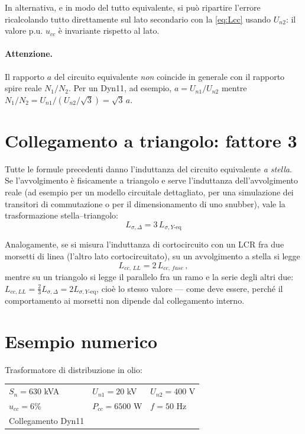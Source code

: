 \documentclass[11pt,a4paper]{article}
\begin{document}
In alternativa, e in modo del tutto equivalente, si può ripartire l'errore ricalcolando
tutto direttamente sul lato secondario con la \eqref{eq:Lcc} usando $U_{n2}$: il valore
p.u. $u_{cc}$ è invariante rispetto al lato.

\paragraph{Attenzione.} Il rapporto $a$ del circuito equivalente \emph{non} coincide in
generale con il rapporto spire reale $N_1/N_2$. Per un Dyn11, ad esempio,
$a = U_{n1}/U_{n2}$ mentre $N_1/N_2 = U_{n1}/(U_{n2}/\sqrt{3}) = \sqrt{3}\,a$.

\section{Collegamento a triangolo: fattore 3}
\label{sec:delta}

Tutte le formule precedenti danno l'induttanza del circuito equivalente \emph{a stella}.
Se l'avvolgimento è fisicamente a triangolo e serve l'induttanza dell'avvolgimento reale
(ad esempio per un modello circuitale dettagliato, per una simulazione dei transitori di
commutazione o per il dimensionamento di uno snubber), vale la trasformazione
stella--triangolo:
\begin{equation}
\boxed{\;L_{\sigma,\Delta} = 3\, L_{\sigma,Y\text{-eq}}\;}
\end{equation}

Analogamente, se si misura l'induttanza di cortocircuito con un LCR fra due morsetti di
linea (l'altro lato cortocircuitato), su un avvolgimento a stella si legge
\begin{equation}
L_{cc,\,LL} = 2\,L_{cc,\,fase}\, ,
\end{equation}
mentre su un triangolo si legge il parallelo fra un ramo e la serie degli altri due:
$L_{cc,LL} = \tfrac{2}{3}L_{\sigma,\Delta} = 2 L_{\sigma,Y\text{-eq}}$, cioè lo stesso
valore --- come deve essere, perché il comportamento ai morsetti non dipende dal
collegamento interno.

\section{Esempio numerico}

Trasformatore di distribuzione in olio:
\begin{center}
\begin{tabular}{lll}
\toprule
$S_n = 630$ kVA & $U_{n1}=20$ kV & $U_{n2}=400$ V \\
$u_{cc}=6\%$ & $P_{cc}=6500$ W & $f=50$ Hz \\
Collegamento Dyn11 & & \\
\bottomrule
\end{tabular}
\end{center}
\end{document}
